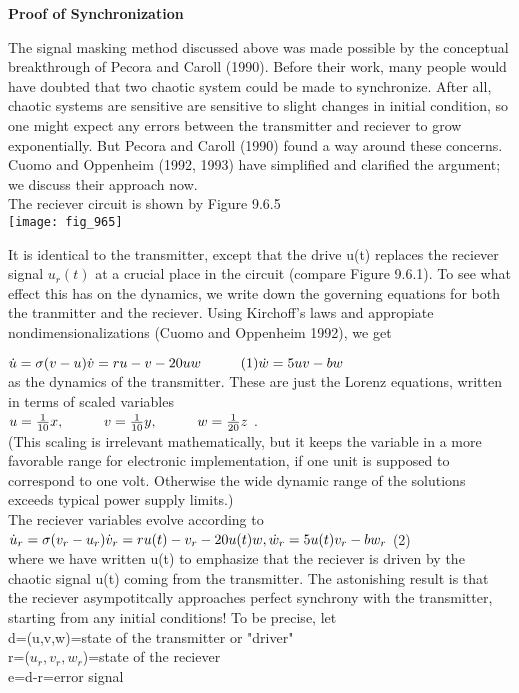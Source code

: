 \documentclass{article}
\newcommand\tab[1][1cm]{\hspace*{#1}}
\begin{document}
\textbf {Proof of Synchronization} \\ \tab

The signal masking method discussed above was made possible by the conceptual breakthrough of Pecora and Caroll (1990). Before their work, many people would have doubted that two chaotic system could be made to synchronize. After all, chaotic systems are sensitive are sensitive to slight changes in initial condition, so one might expect any errors between the transmitter and reciever to grow exponentially. But Pecora and Caroll (1990) found a way around these concerns. Cuomo and Oppenheim (1992, 1993) have simplified and clarified the argument; we discuss their approach now. \\ The reciever circuit is shown by Figure 9.6.5 \\

\texttt{[image: fig\_965]} 

It is identical to the transmitter, except that the drive u(t) replaces the reciever signal $u_{r}(t)$ at a crucial place in the circuit (compare Figure 9.6.1). To see what effect this has on the dynamics, we write down the governing equations for both the tranmitter and the reciever. Using Kirchoff's laws and appropiate nondimensionalizations (Cuomo and Oppenheim 1992), we get \\ \tab \tab

$\dot{u}=\sigma (v-u) \\
\dot{v}=ru-v-20uw \tab (1) \\
\dot{w}=5uv-bw$ \\

as the dynamics of the transmitter. These are just the Lorenz equations, written in terms of scaled variables \\ \tab \tab
$u = \frac{1}{10}x, \tab v=\frac{1}{10}y, \tab w=\frac{1}{20}z$ . \\
(This scaling is irrelevant mathematically, but it keeps the variable in a more favorable range for electronic implementation, if one unit is supposed to correspond to one volt. Otherwise the wide dynamic range of the solutions exceeds typical power supply limits.) \\ \tab
The reciever variables evolve according to \\ \tab \tab
$\dot{u}_{r}=\sigma(v_{r}-u_{r}) \\
\dot{v}_{r}=ru(t)-v_{r}-20u(t)w, \\
\dot{w}_{r}=5u(t)v_{r}-bw_{r}$ \tab (2) \\
where we have written u(t) to emphasize that the reciever is driven by the chaotic signal u(t) coming from the transmitter. The astonishing result is that the reciever asympotitcally approaches perfect synchrony with the transmitter, starting from any initial conditions! To be precise, let \\ \tab \tab
d=(u,v,w)=state of the transmitter or "driver" \\ \tab \tab
r=($u_{r},v_{r},w_{r}$)=state of the reciever \\ \tab \tab
e=d-r=error signal \\ 
\end{document}
